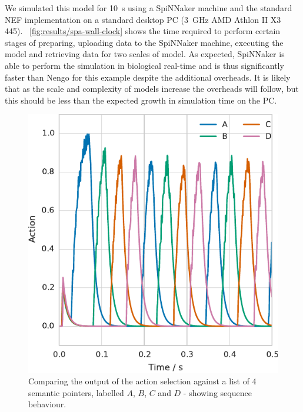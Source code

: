 \documentclass[conference]{IEEEtran}
\begin{document}
  We simulated this model for \SI{10}{\second} using a SpiNNaker machine and the standard NEF implementation on a standard desktop PC (\SI{3}{\giga\hertz} AMD Athlon II X3 445).
  \figurename~\ref{fig:results/spa-wall-clock} shows the time required to perform certain stages of preparing, uploading data to the SpiNNaker machine, executing the model and retrieving data for two scales of model.
  As expected, SpiNNaker is able to perform the simulation in biological real-time and is thus significantly faster than Nengo for this example despite the additional overheads.
  It is likely that as the scale and complexity of models increase the overheads will follow, but this should be less than the expected growth in simulation time on the PC.

  \begin{figure}[!t]
    \includegraphics{figures/sequence}
    \caption{Comparing the output of the action selection against a list of 4 semantic pointers, labelled $A$, $B$, $C$ and $D$ - showing sequence behaviour.}
    \label{fig:results/sequence}
  \end{figure}
\end{document}

